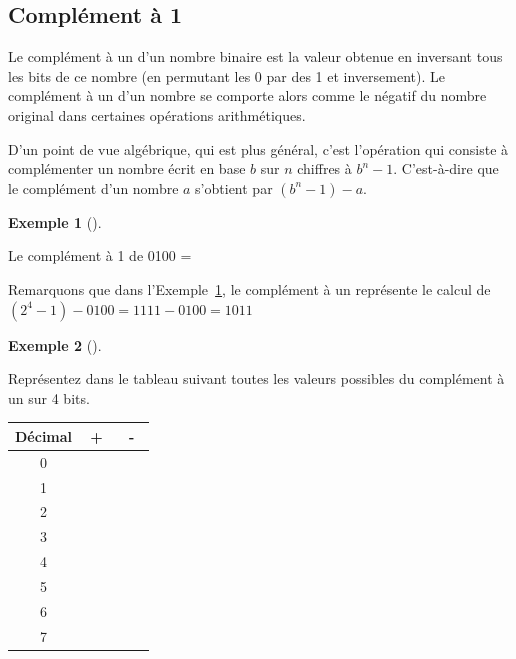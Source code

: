 \documentclass[
  letterpaper,
]{scrbook}
\theoremstyle{definition}
\newtheorem{example}{Exemple}[chapter]
\theoremstyle{definition}
\theoremstyle{plain}
\theoremstyle{remark}
\begin{document}
\hypertarget{compluxe9ment-uxe0-1}{%
\subsection{Complément à 1}\label{compluxe9ment-uxe0-1}}

Le complément à un d'un nombre binaire est la valeur obtenue en
inversant tous les bits de ce nombre (en permutant les 0 par des 1 et
inversement). Le complément à un d'un nombre se comporte alors comme le
négatif du nombre original dans certaines opérations arithmétiques.

D'un point de vue algébrique, qui est plus général, c'est l'opération
qui consiste à complémenter un nombre écrit en base \(b\) sur \(n\)
chiffres à \(b^n-1\). C'est-à-dire que le complément d'un nombre \(a\)
s'obtient par \((b^n−1)−a\).

\leavevmode{}%
\begin{example}[]\label{exm-complement-a-un}

Le complément à 1 de 0100 =

\end{example}

\begin{tcolorbox}[enhanced jigsaw, colframe=quarto-callout-note-color-frame, bottomtitle=1mm, coltitle=black, breakable, arc=.35mm, title=\textcolor{quarto-callout-note-color}{\faInfo}\hspace{0.5em}{Note}, opacitybacktitle=0.6, colback=white, opacityback=0, colbacktitle=quarto-callout-note-color!10!white, leftrule=.75mm, rightrule=.15mm, titlerule=0mm, toprule=.15mm, toptitle=1mm, left=2mm, bottomrule=.15mm]

Remarquons que dans l'Exemple~\ref{exm-complement-a-un}, le complément à
un représente le calcul de \((2^4-1)-0100=1111-0100=1011\)

\end{tcolorbox}

\leavevmode{}%
\begin{example}[]\label{exm-complement-a-un-4-bits}

Représentez dans le tableau suivant toutes les valeurs possibles du
complément à un sur 4 bits.

\begin{longtable}[]{@{}ccc@{}}
\toprule()
\textbf{Décimal} & \textbf{+} & \textbf{-} \\
\midrule()
\endhead
0 & \(\phantom{000}\) & \(\phantom{000}\) \\
1 & & \\
2 & & \\
3 & & \\
4 & & \\
5 & & \\
6 & & \\
7 & & \\
\bottomrule()
\end{longtable}

\end{example}
\end{document}
